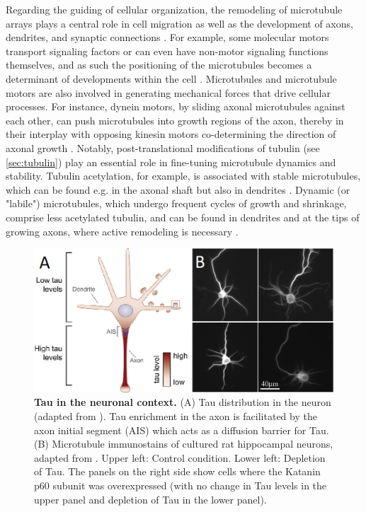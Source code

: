 Regarding the guiding of cellular organization, the remodeling of microtubule arrays plays a central role in cell migration as well as the development of axons, dendrites, and synaptic connections \parencite{Kapitein2015}. For example, some molecular motors transport signaling factors or can even have non-motor signaling functions themselves, and as such the positioning of the microtubules becomes a determinant of developments within the cell \parencite{Hirokawa2010}. Microtubules and microtubule motors are also involved in generating mechanical forces that drive cellular processes. For instance, dynein motors, by sliding axonal microtubules against each other, can push microtubules into growth regions of the axon, thereby in their interplay with opposing kinesin motors co-determining the direction of axonal growth \parencite{Kahn2016}. Notably, post-translational modifications of tubulin (see \autoref{sec:tubulin}) play an essential role in fine-tuning microtubule dynamics and stability. Tubulin acetylation, for example, is associated with stable microtubules, which can be found e.g. in the axonal shaft but also in dendrites \parencite{Tas2017}. Dynamic (or "labile") microtubules, which undergo frequent cycles of growth and shrinkage, comprise less acetylated tubulin, and can be found in dendrites and at the tips of growing axons, where active remodeling is necessary \parencite{Baas2016, Tas2017}. \par

\begin{figure}[h!tb]
	\centering
	\includegraphics[width=\linewidth]{Figures/neuron.png}
	\caption[Tau in the neuronal context.]{\textbf{Tau in the neuronal context.}
	(A) Tau distribution in the neuron (adapted from \cite{Ittner2018}). Tau enrichment in the axon is facilitated by the axon initial segment (AIS) which acts as a diffusion barrier for Tau. (B) Microtubule immunostains of cultured rat hippocampal neurons, adapted from \cite{Qiang2006}. Upper left: Control condition. Lower left: Depletion of Tau. The panels on the right side show cells where the Katanin p60 subunit was overexpressed (with no change in Tau levels in the upper panel and depletion of Tau in the lower panel).
		}\label{neuron}
\end{figure}

